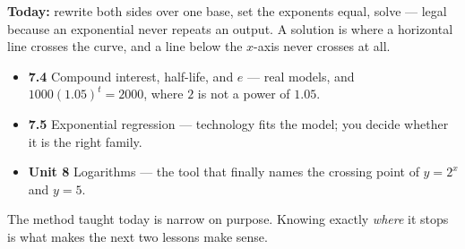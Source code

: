 \documentclass[aspectratio=169, 11pt]{beamer}
\begin{document}
\begin{frame}[t, plain]
  \textbf{Today:} rewrite both sides over one base, set the exponents equal, solve --- legal because an
  exponential never repeats an output. A solution is where a horizontal line crosses the curve, and a
  line below the $x$-axis never crosses at all.\\[8pt]
  \begin{itemize}\setlength{\itemsep}{3pt}
    \item \textbf{7.4} Compound interest, half-life, and $e$ --- real models, and $1000(1.05)^{t}=2000$, where $2$ is not a power of $1.05$.
    \item \textbf{7.5} Exponential regression --- technology fits the model; you decide whether it is the right family.
    \item \textbf{Unit 8} Logarithms --- the tool that finally names the crossing point of $y=2^{x}$ and $y=5$.
  \end{itemize}
  \vspace{6pt}
  \begin{center}
    {\footnotesize The method taught today is narrow on purpose. Knowing exactly \emph{where} it stops
    is what makes the next two lessons make sense.}
  \end{center}
\end{frame}
\end{document}
